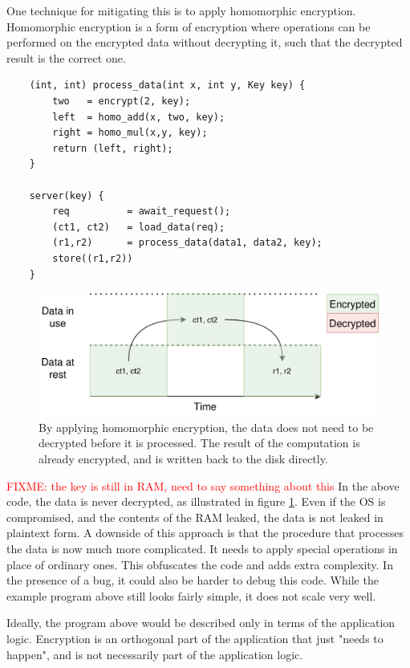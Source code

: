 One technique for mitigating this is to apply homomorphic encryption\cite{DBLP:conf/stoc/Gentry09}. Homomorphic encryption is a form of encryption where
operations can be performed on the encrypted data without decrypting it, such that the decrypted result is the correct one.

\begin{verbatim}
    (int, int) process_data(int x, int y, Key key) {
        two   = encrypt(2, key);
        left  = homo_add(x, two, key);
        right = homo_mul(x,y, key);
        return (left, right);
    }

    server(key) {
        req          = await_request();
        (ct1, ct2)   = load_data(req);
        (r1,r2)      = process_data(data1, data2, key);
        store((r1,r2))
    }
\end{verbatim}

\begin{figure}
    \centering
    \includegraphics[scale=0.2]{graphics/safe-data-in-use.png}
    \caption{By applying homomorphic encryption, the data does not need to be decrypted before it is processed. The result
    of the computation is already encrypted, and is written back to the disk directly.}
    \label{graphics:safe-data-in-use}
\end{figure}

\textcolor{red}{FIXME: the key is still in RAM, need to say something about this}
In the above code, the data is never decrypted, as illustrated in figure \ref{graphics:safe-data-in-use}. Even if the OS is compromised, and the contents of the RAM leaked, the
data is not leaked in plaintext form. A downside of this approach is that the procedure that processes the data is now
much more complicated. It needs to apply special operations in place of ordinary ones. This obfuscates the code and
adds extra complexity. In the presence of a bug, it could also be harder to debug this code. While the example program
above still looks fairly simple, it does not scale very well.

Ideally, the program above would be described only in terms of the application logic. Encryption is an orthogonal part of
the application that just "needs to happen", and is not necessarily part of the application logic.

